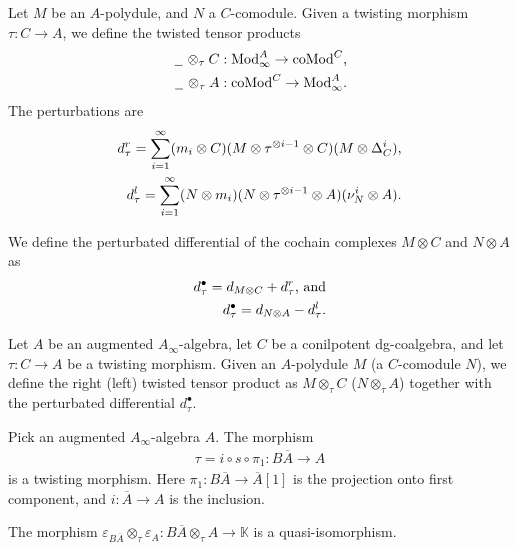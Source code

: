 \documentclass[../thesis.tex]{subfiles}
\begin{document}
            Let $M$ be an $A$-polydule, and $N$ a $C$-comodule. Given a twisting morphism $\tau : C \rightarrow A$, we define the twisted tensor products
            \begin{align*}
                \argument \otimes_\tau C & : \tt{Mod}_\infty^A \rightarrow \tt{coMod}^C\tt{,} \\
                \argument \otimes_\tau A & : \tt{coMod}^C \rightarrow \tt{Mod}_\infty^A\tt{.}
            \end{align*}
            The perturbations are
            \begin{align*}
                d_\tau^r = \sum_{i=1}^\infty (m_i \otimes C)(M \otimes \tau^{\otimes i-1} \otimes C)(M \otimes \Delta_C^i)\tt{,} \\
                d_\tau^l = \sum_{i=1}^\infty (N \otimes m_i) (N \otimes \tau^{\otimes i-1} \otimes A)(\nu_N^i \otimes A)\tt{.}
            \end{align*}

            We define the perturbated differential of the cochain complexes $M \otimes C$ and $N \otimes A$ as
            \begin{align*}
                d_\tau^\bullet = d_{M \otimes C} + d_\tau^r\tt{, and} \\
                d_\tau^\bullet = d_{N \otimes A} - d_\tau^l\tt{.}
            \end{align*}

            \begin{definition}
                Let $A$ be an augmented $A_\infty$-algebra, let $C$ be a conilpotent dg-coalgebra, and let $\tau: C \rightarrow A$ be a twisting morphism. Given an $A$-polydule $M$ (a $C$-comodule $N$), we define the right (left) twisted tensor product as $M \otimes_{\tau} C$ ($N \otimes_\tau A$) together with the perturbated differential $d_\tau^\bullet$.
            \end{definition}

            Pick an augmented $A_\infty$-algebra $A$. The morphism
            \begin{align*}
                \tau = i \circ s\circ \pi_1 : B\overline{A} \rightarrow A
            \end{align*}
            is a twisting morphism. Here $\pi_1 : B\overline{A} \rightarrow \overline{A}[1]$ is the projection onto first component, and $i : \overline{A} \rightarrow A$ is the inclusion.

            \begin{lemma}\label{lem: twisting-acyclic-v.2}
                The morphism $\varepsilon_{B\overline{A}}\otimes_\tau \varepsilon_A : B\overline{A} \otimes_\tau A \rightarrow \mathbb{K}$ is a quasi-isomorphism.
            \end{lemma}
\end{document}

